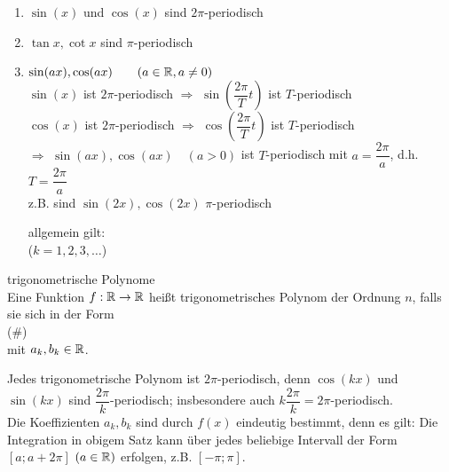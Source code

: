 \Bsp
\begin{enumerate}
	\item $\sin(x)$ und $\cos(x)$ sind $2\pi$-periodisch
	\item $\tan x, \cot x$ sind $\pi$-periodisch
	\item $\sin(ax), \cos(ax)\qquad(a\in\mathbb{R},a\ne0)$\\
	$\sin(x)$ ist $2\pi$-periodisch $\Rightarrow$ $\sin\left(\dfrac{2\pi}{T}t\right)$ ist $T$-periodisch\\
	$\cos(x)$ ist $2\pi$-periodisch $\Rightarrow$ $\cos\left(\dfrac{2\pi}{T}t\right)$ ist $T$-periodisch\\
	$\Rightarrow$ $\sin(ax), \cos(ax)\quad(a>0)$ ist $T$-periodisch mit $a=\dfrac{2\pi}{a}$, d.h. $T=\dfrac{2\pi}{a}$\\
	z.B. sind $\sin(2x), \cos(2x)$ $\pi$-periodisch
	
	allgemein gilt:\\
	\hhspace{2cm}\quad($k=1,2,3,\ldots$)
\end{enumerate}

\Def trigonometrische Polynome\\
Eine Funktion $f:\mathbb{R}\to\mathbb{R}$ heißt trigonometrisches Polynom der Ordnung $n$, falls sie sich in der Form\\
\hhspace{2cm}\quad(\#)\\
mit $a_k,b_k\in\mathbb{R}$.

\Bem Jedes trigonometrische Polynom ist $2\pi$-periodisch, denn $\cos(kx)$ und $\sin(kx)$ sind $\dfrac{2\pi}{k}$-periodisch; insbesondere auch $k\dfrac{2\pi}{k}=2\pi$-periodisch.\\
Die Koeffizienten $a_k,b_k$ sind durch $f(x)$ eindeutig bestimmt, denn es gilt:
Die Integration in obigem Satz kann über jedes beliebige Intervall der Form ${[a;a+2\pi]}$ $(a\in\mathbb{R})$ erfolgen, z.B. ${[-\pi;\pi]}$.

